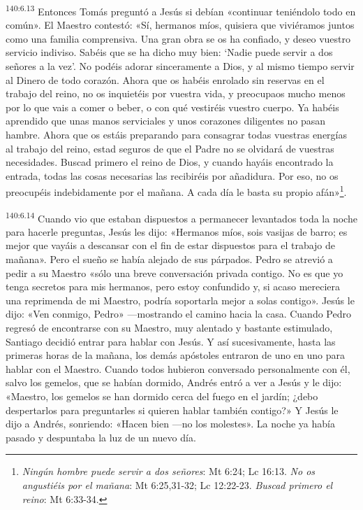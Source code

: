 \par 
\textsuperscript{140:6.13} Entonces Tomás preguntó a Jesús si debían «continuar teniéndolo todo en común». El Maestro contestó: «Sí, hermanos míos, quisiera que viviéramos juntos como una familia comprensiva. Una gran obra se os ha confiado, y deseo vuestro servicio indiviso. Sabéis que se ha dicho muy bien: `Nadie puede servir a dos señores a la vez'. No podéis adorar sinceramente a Dios, y al mismo tiempo servir al Dinero de todo corazón. Ahora que os habéis enrolado sin reservas en el trabajo del reino, no os inquietéis por vuestra vida, y preocupaos mucho menos por lo que vais a comer o beber, o con qué vestiréis vuestro cuerpo. Ya habéis aprendido que unas manos serviciales y unos corazones diligentes no pasan hambre. Ahora que os estáis preparando para consagrar todas vuestras energías al trabajo del reino, estad seguros de que el Padre no se olvidará de vuestras necesidades. Buscad primero el reino de Dios, y cuando hayáis encontrado la entrada, todas las cosas necesarias las recibiréis por añadidura. Por eso, no os preocupéis indebidamente por el mañana. A cada día le basta su propio afán»\footnote{\textit{Ningún hombre puede servir a dos señores}: Mt 6:24; Lc 16:13. \textit{No os angustiéis por el mañana}: Mt 6:25,31-32; Lc 12:22-23. \textit{Buscad primero el reino}: Mt 6:33-34.}.

\par 
\textsuperscript{140:6.14} Cuando vio que estaban dispuestos a permanecer levantados toda la noche para hacerle preguntas, Jesús les dijo: «Hermanos míos, sois vasijas de barro; es mejor que vayáis a descansar con el fin de estar dispuestos para el trabajo de mañana». Pero el sueño se había alejado de sus párpados. Pedro se atrevió a pedir a su Maestro «sólo una breve conversación privada contigo. No es que yo tenga secretos para mis hermanos, pero estoy confundido y, si acaso mereciera una reprimenda de mi Maestro, podría soportarla mejor a solas contigo». Jesús le dijo: «Ven conmigo, Pedro» ---mostrando el camino hacia la casa. Cuando Pedro regresó de encontrarse con su Maestro, muy alentado y bastante estimulado, Santiago decidió entrar para hablar con Jesús. Y así sucesivamente, hasta las primeras horas de la mañana, los demás apóstoles entraron de uno en uno para hablar con el Maestro. Cuando todos hubieron conversado personalmente con él, salvo los gemelos, que se habían dormido, Andrés entró a ver a Jesús y le dijo: «Maestro, los gemelos se han dormido cerca del fuego en el jardín; ¿debo despertarlos para preguntarles si quieren hablar también contigo?» Y Jesús le dijo a Andrés, sonriendo: «Hacen bien ---no los molestes». La noche ya había pasado y despuntaba la luz de un nuevo día.

